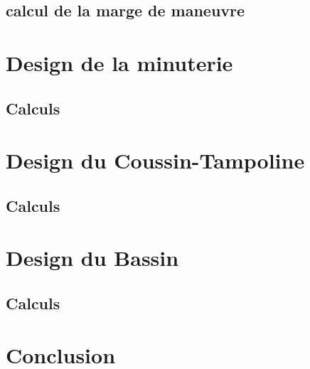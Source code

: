 \documentclass[12pt]{article}
\begin{document}
\subsection{calcul de la marge de maneuvre}


\section{Design de la minuterie}
\subsection{Calculs}

\section{Design du Coussin-Tampoline}
\subsection{Calculs}

\section{Design du Bassin}
\subsection{Calculs}

\section{Conclusion}
\end{document}
